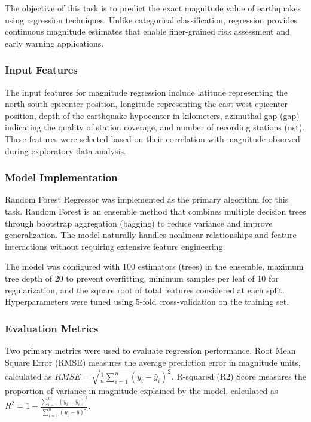 The objective of this task is to predict the exact magnitude value of earthquakes using regression techniques. Unlike categorical classification, regression provides continuous magnitude estimates that enable finer-grained risk assessment and early warning applications.

\subsubsection{Input Features}

The input features for magnitude regression include latitude representing the north-south epicenter position, longitude representing the east-west epicenter position, depth of the earthquake hypocenter in kilometers, azimuthal gap (gap) indicating the quality of station coverage, and number of recording stations (nst). These features were selected based on their correlation with magnitude observed during exploratory data analysis.

\subsubsection{Model Implementation}

Random Forest Regressor was implemented as the primary algorithm for this task. Random Forest is an ensemble method that combines multiple decision trees through bootstrap aggregation (bagging) to reduce variance and improve generalization. The model naturally handles nonlinear relationships and feature interactions without requiring extensive feature engineering.

The model was configured with 100 estimators (trees) in the ensemble, maximum tree depth of 20 to prevent overfitting, minimum samples per leaf of 10 for regularization, and the square root of total features considered at each split. Hyperparameters were tuned using 5-fold cross-validation on the training set.

\subsubsection{Evaluation Metrics}

Two primary metrics were used to evaluate regression performance. Root Mean Square Error (RMSE) measures the average prediction error in magnitude units, calculated as $RMSE = \sqrt{\frac{1}{n}\sum_{i=1}^{n}(y_i - \hat{y}_i)^2}$. R-squared (R2) Score measures the proportion of variance in magnitude explained by the model, calculated as $R^2 = 1 - \frac{\sum_{i=1}^{n}(y_i - \hat{y}_i)^2}{\sum_{i=1}^{n}(y_i - \bar{y})^2}$.

